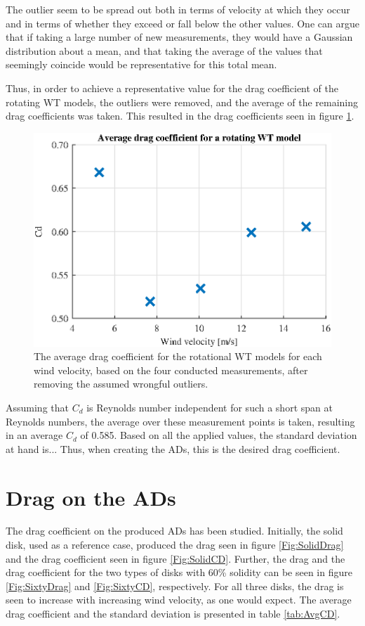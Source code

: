 The outlier seem to be spread out both in terms of velocity at which they occur and in terms of whether they exceed or fall below the other values. One can argue that if taking a large number of new measurements, they would have a Gaussian distribution about a mean, and that taking the average of the values that seemingly coincide would be representative for this total mean. %

Thus, in order to achieve a representative value for the drag coefficient of the rotating WT models, the outliers were removed, and the average of the remaining drag coefficients was taken. This resulted in the drag coefficients seen in figure \ref{fig:RotationalAvg}.

\begin{figure}[h!]
    \centering
    \includegraphics[width=\linewidth]{0_Images/RotationalAverage.eps}
    \caption{The average drag coefficient for the rotational WT models for each wind velocity, based on the four conducted measurements, after removing the assumed wrongful outliers.}
    \label{fig:RotationalAvg}
\end{figure}

Assuming that $C_d$ is Reynolds number independent for such a short span at Reynolds numbers, the average over these measurement points is taken, resulting in an average $C_d$ of 0.585. Based on all the applied values, the standard deviation at hand is... Thus, when creating the ADs, this is the desired drag coefficient. 




\section{Drag on the ADs}
The drag coefficient on the produced ADs has been studied. Initially, the solid disk, used as a reference case, produced the drag seen in figure \ref{Fig:SolidDrag} and the drag coefficient seen in figure \ref{Fig:SolidCD}. Further, the drag and the drag coefficient for the two types of disks with 60\% solidity can be seen in figure \ref{Fig:SixtyDrag} and \ref{Fig:SixtyCD}, respectively. For all three disks, the drag is seen to increase with increasing wind velocity, as one would expect. The average drag coefficient and the standard deviation is presented in table \ref{tab:AvgCD}.



